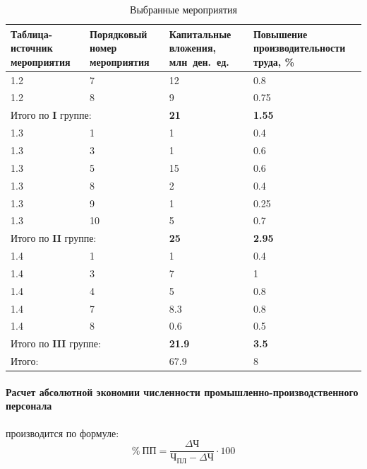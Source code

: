 \begin{table}[htbp]
  \caption{Выбранные мероприятия\label{tbl:solution}}
  \centering
    \begin{tabular}{| m{3cm} | m{4.2cm} | m{3cm} | m{4.5cm} |}
      \hline
      Таблица-источник мероприятия & Порядковый номер мероприятия & Капитальные \newline вложения, млн~ден.~ед. & Повышение \newline производительности труда, \% \\ \hline
      1.2 & 7 & 12 & 0.8 \\ \hline
      1.2 & 8 & 9 & 0.75 \\ \hline
      \multicolumn{2}{|l|}{Итого по \textbf{I} группе:} & \textbf{21} & \textbf{1.55} \\ \hline
      1.3 & 1 & 1 & 0.4 \\ \hline
      1.3 & 3 & 1 & 0.6 \\ \hline
      1.3 & 5 & 15 & 0.6 \\ \hline
      1.3 & 8 & 2 & 0.4 \\ \hline
      1.3 & 9 & 1 & 0.25 \\ \hline
      1.3 & 10 & 5 & 0.7 \\ \hline
      \multicolumn{2}{|l|}{Итого по \textbf{II} группе:} & \textbf{25} & \textbf{2.95} \\ \hline
      1.4 & 1 & 1 & 0.4 \\ \hline
      1.4 & 3 & 7 & 1 \\ \hline
      1.4 & 4 & 5 & 0.8 \\ \hline
      1.4 & 7 & 8.3 & 0.8 \\ \hline
      1.4 & 8 & 0.6 & 0.5 \\ \hline
      \multicolumn{2}{|l|}{Итого по \textbf{III} группе:} & \textbf{21.9} & \textbf{3.5} \\ \hline
      \multicolumn{2}{|l|}{Итого:} & 67.9 & 8 \\ \hline
    \end{tabular}
\end{table}

\paragraph{Расчет абсолютной экономии численности промышленно-производственного
 персонала} производится по формуле:
\begin{equation}
\% ~ \text{ПП} = \dfrac{\Delta\text{Ч}}{\text{Ч}_{\text{ПЛ}} - \Delta\text{Ч}} \cdot 100
\end{equation}

